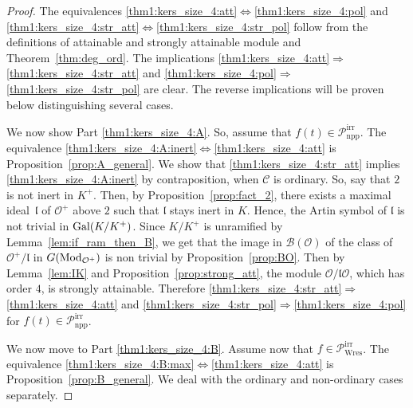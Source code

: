 \documentclass[11pt]{amsart}
\def\Gal{\mathop{\rm Gal}\nolimits}
\def\Mod{\mathop{\rm Mod}\nolimits}
\newcommand\cB{\mathcal{B}}
\newcommand\cC{\mathcal{C}}
\newcommand\cO{\mathcal{O}}
\newcommand\frl{\mathfrak{l}}
\theoremstyle{plain}
\theoremstyle{definition}
\newcommand\PirrA{\mathcal{P}^\mathrm{irr}_\mathrm{npp}}
\newcommand\PirrB{\mathcal{P}^\mathrm{irr}_\mathrm{Wres}}
\begin{document}
\begin{proof}
    The equivalences \ref{thm1:kers_size_4:att}$\iff$\ref{thm1:kers_size_4:pol} and \ref{thm1:kers_size_4:str_att}$\iff$\ref{thm1:kers_size_4:str_pol} 
    follow from the definitions of attainable and strongly attainable module and Theorem~\ref{thm:deg_ord}.
    The implications \ref{thm1:kers_size_4:att}$\Rightarrow$\ref{thm1:kers_size_4:str_att}  and \ref{thm1:kers_size_4:pol}$\Rightarrow$\ref{thm1:kers_size_4:str_pol} are clear.
    The reverse implications will be proven below distinguishing several cases.

    We now show Part \ref{thm1:kers_size_4:A}.
    So, assume that $f(t)\in\PirrA$.
    The equivalence \ref{thm1:kers_size_4:A:inert}$\iff$\ref{thm1:kers_size_4:att} is Proposition~\ref{prop:A_general}.
    We show that \ref{thm1:kers_size_4:str_att} implies \ref{thm1:kers_size_4:A:inert} by contraposition, when $\cC$ is ordinary.
    So, say that $2$ is not inert in $K^+$.
    Then, by Proposition~\ref{prop:fact_2}, there exists a maximal ideal~$\frl$ of $\cO^+$ above $2$ such that $\frl$ stays inert in $K$.
    Hence, the Artin symbol of $\frl$ is not trivial in $\Gal(K/K^+)$.
    Since $K/K^+$ is unramified by Lemma~\ref{lem:if_ram_then_B}, we get that the image in $\cB(\cO)$ of the class of $\cO^+/\frl$ in $G(\Mod_{\cO^+})$ is non trivial by Proposition~\ref{prop:BO}.
    Then by Lemma~\ref{lem:IK} and Proposition~\ref{prop:strong_att}, the module $\cO/\frl\cO$, which has order $4$, is strongly attainable.
    Therefore \ref{thm1:kers_size_4:str_att}$\Rightarrow$\ref{thm1:kers_size_4:att} and \ref{thm1:kers_size_4:str_pol}$\Rightarrow$\ref{thm1:kers_size_4:pol} for $f(t)\in\PirrA$.

    We now move to Part \ref{thm1:kers_size_4:B}.
    Assume now that $f\in \PirrB$.
    The equivalence \ref{thm1:kers_size_4:B:max}$\iff$\ref{thm1:kers_size_4:att} is Proposition~\ref{prop:B_general}.
    We deal with the ordinary and non-ordinary cases separately.
    

\end{proof}
\end{document}
